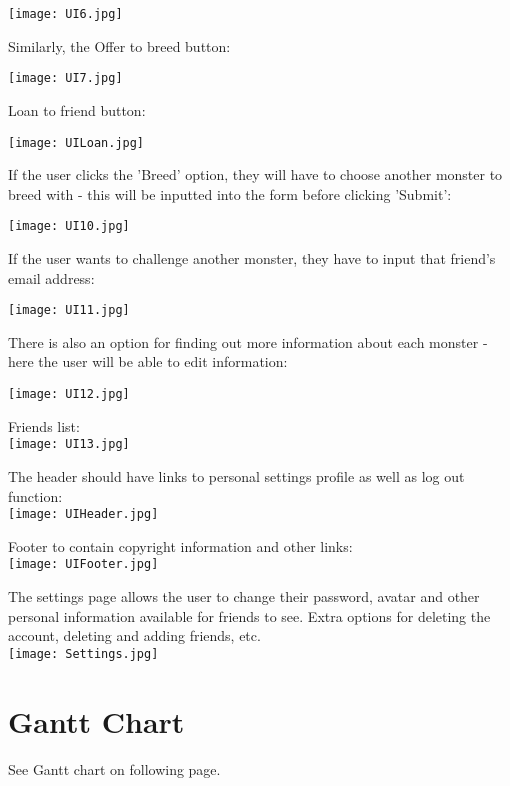 \documentclass[a4paper]{article}
\begin{document}
\texttt{[image: UI6.jpg]}

Similarly, the Offer to breed button:

\texttt{[image: UI7.jpg]}

Loan to friend button:

\texttt{[image: UILoan.jpg]}
\clearpage

If the user clicks the 'Breed' option, they will have to choose another monster to breed with - this will be inputted into the form before clicking 'Submit':

\texttt{[image: UI10.jpg]}

If the user wants to challenge another monster, they have to input that friend's email address:

\texttt{[image: UI11.jpg]}
\clearpage

There is also an option for finding out more information about each monster - here the user will be able to edit information:

\texttt{[image: UI12.jpg]}
\clearpage

Friends list:\\

\texttt{[image: UI13.jpg]}
\clearpage

The header should have links to personal settings profile as well as log out function:\\

\texttt{[image: UIHeader.jpg]}
\clearpage

Footer to contain copyright information and other links:\\

\texttt{[image: UIFooter.jpg]}
\clearpage

The settings page allows the user to change their password, avatar and other personal information available for friends to see. Extra options for deleting the account, deleting and adding friends, etc.\\

\texttt{[image: Settings.jpg]}
\clearpage

\section{Gantt Chart}

See Gantt chart on following page.

\clearpage
\end{document}
